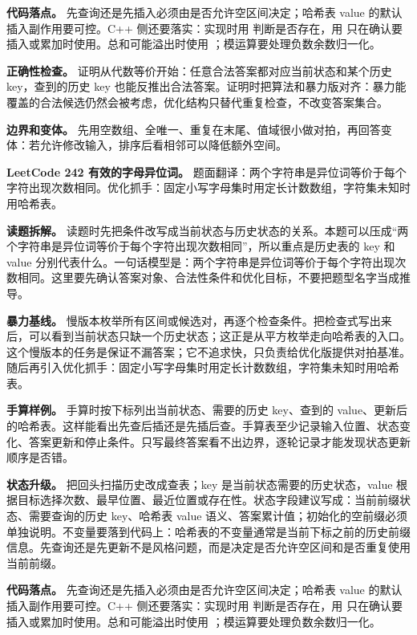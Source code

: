 \textbf{代码落点。} 先查询还是先插入必须由是否允许空区间决定；哈希表 value 的默认插入副作用要可控。C++ 侧还要落实：实现时用  判断是否存在，用  只在确认要插入或累加时使用。总和可能溢出时使用 ；模运算要处理负数余数归一化。

\textbf{正确性检查。} 证明从代数等价开始：任意合法答案都对应当前状态和某个历史 key，查到的历史 key 也能反推出合法答案。证明时把算法和暴力版对齐：暴力能覆盖的合法候选仍然会被考虑，优化结构只替代重复检查，不改变答案集合。

\textbf{边界和变体。} 先用空数组、全唯一、重复在末尾、值域很小做对拍，再回答变体：若允许修改输入，排序后看相邻可以降低额外空间。

\noindent\textbf{LeetCode 242 有效的字母异位词。} 题面翻译：两个字符串是异位词等价于每个字符出现次数相同。优化抓手：固定小写字母集时用定长计数数组，字符集未知时用哈希表。

\textbf{读题拆解。} 读题时先把条件改写成当前状态与历史状态的关系。本题可以压成“两个字符串是异位词等价于每个字符出现次数相同”，所以重点是历史表的 key 和 value 分别代表什么。一句话模型是：两个字符串是异位词等价于每个字符出现次数相同。这里要先确认答案对象、合法性条件和优化目标，不要把题型名字当成推导。

\textbf{暴力基线。} 慢版本枚举所有区间或候选对，再逐个检查条件。把检查式写出来后，可以看到当前状态只缺一个历史状态；这正是从平方枚举走向哈希表的入口。这个慢版本的任务是保证不漏答案；它不追求快，只负责给优化版提供对拍基准。随后再引入优化抓手：固定小写字母集时用定长计数数组，字符集未知时用哈希表。

\textbf{手算样例。} 手算时按下标列出当前状态、需要的历史 key、查到的 value、更新后的哈希表。这样能看出先查后插还是先插后查。手算表至少记录输入位置、状态变化、答案更新和停止条件。只写最终答案看不出边界，逐轮记录才能发现状态更新顺序是否错。

\textbf{状态升级。} 把回头扫描历史改成查表；key 是当前状态需要的历史状态，value 根据目标选择次数、最早位置、最近位置或存在性。状态字段建议写成：当前前缀状态、需要查询的历史 key、哈希表 value 语义、答案累计值；初始化的空前缀必须单独说明。不变量要落到代码上：哈希表的不变量通常是当前下标之前的历史前缀信息。先查询还是先更新不是风格问题，而是决定是否允许空区间和是否重复使用当前前缀。

\textbf{代码落点。} 先查询还是先插入必须由是否允许空区间决定；哈希表 value 的默认插入副作用要可控。C++ 侧还要落实：实现时用  判断是否存在，用  只在确认要插入或累加时使用。总和可能溢出时使用 ；模运算要处理负数余数归一化。

